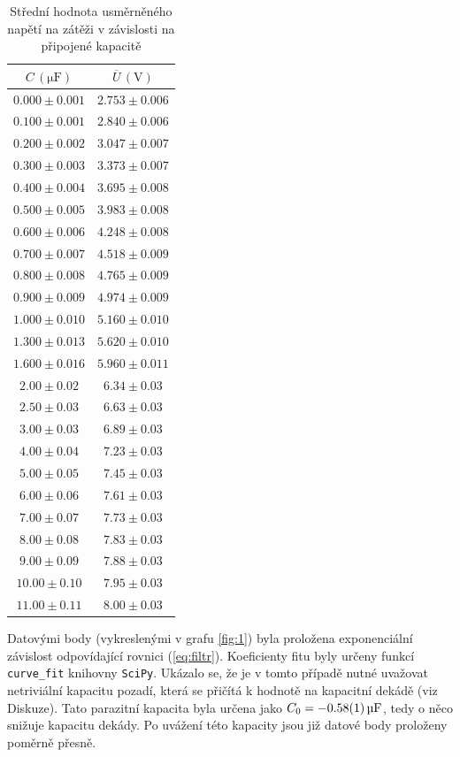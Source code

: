 \documentclass{../concepts/prepareprotokol} %
\begin{document}
\begin{table}[!htbp]
\centering
\caption{Střední hodnota usměrněného napětí na zátěži v závislosti na připojené kapacitě}
\begin{tabular}{cc}
 \toprule
 $C\, (\mathrm{\mu F})$ & $\overline{U}\, (\mathrm{V})$ \\
 \midrule
 $0.000 \pm 0.001$ & $2.753 \pm 0.006$ \\
 $0.100 \pm 0.001$ & $2.840 \pm 0.006$ \\
 $0.200 \pm 0.002$ & $3.047 \pm 0.007$ \\
 $0.300 \pm 0.003$ & $3.373 \pm 0.007$ \\
 $0.400 \pm 0.004$ & $3.695 \pm 0.008$ \\
 $0.500 \pm 0.005$ & $3.983 \pm 0.008$ \\
 $0.600 \pm 0.006$ & $4.248 \pm 0.008$ \\
 $0.700 \pm 0.007$ & $4.518 \pm 0.009$ \\
 $0.800 \pm 0.008$ & $4.765 \pm 0.009$ \\
 $0.900 \pm 0.009$ & $4.974 \pm 0.009$ \\
 $1.000 \pm 0.010$ & $5.160 \pm 0.010$ \\
 $1.300 \pm 0.013$ & $5.620 \pm 0.010$ \\
 $1.600 \pm 0.016$ & $5.960 \pm 0.011$ \\
 $2.00 \pm 0.02$ & $6.34 \pm 0.03$ \\
 $2.50 \pm 0.03$ & $6.63 \pm 0.03$ \\
 $3.00 \pm 0.03$ & $6.89 \pm 0.03$ \\
 $4.00 \pm 0.04$ & $7.23 \pm 0.03$ \\
 $5.00 \pm 0.05$ & $7.45 \pm 0.03$ \\
 $6.00 \pm 0.06$ & $7.61 \pm 0.03$ \\
 $7.00 \pm 0.07$ & $7.73 \pm 0.03$ \\
 $8.00 \pm 0.08$ & $7.83 \pm 0.03$ \\
 $9.00 \pm 0.09$ & $7.88 \pm 0.03$ \\
 $10.00 \pm 0.10$ & $7.95 \pm 0.03$ \\
 $11.00 \pm 0.11$ & $8.00 \pm 0.03$ \\
 \bottomrule
\end{tabular}
\label{tab:1}
\end{table}

Datovými body (vykreslenými v grafu \ref{fig:1}) byla proložena exponenciální závislost odpovídající rovnici (\ref{eq:filtr}). Koeficienty fitu byly určeny funkcí \verb|curve_fit| knihovny \verb|SciPy|. Ukázalo se, že je v tomto případě nutné uvažovat netriviální kapacitu pozadí, která se přičítá k hodnotě na kapacitní dekádě (viz Diskuze). Tato parazitní kapacita byla určena jako $C_0 = \qty{-0.58 \pm 0.01}{\micro\farad}$, tedy o něco snižuje kapacitu dekády. Po uvážení této kapacity jsou již datové body proloženy poměrně přesně.
\end{document}
